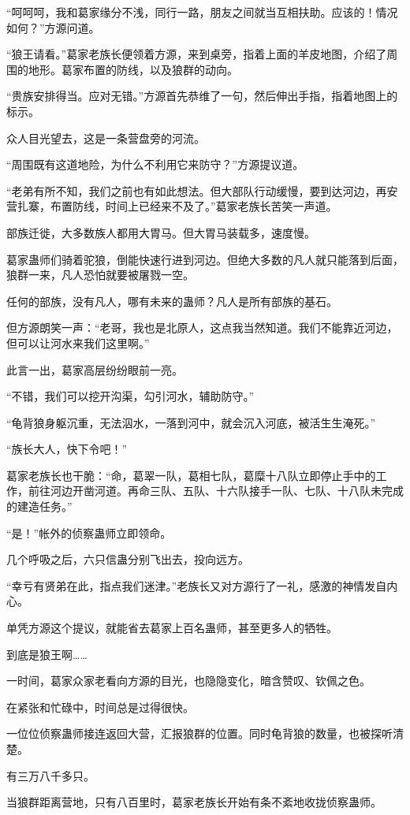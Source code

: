 \begin{this_body}
“呵呵呵，我和葛家缘分不浅，同行一路，朋友之间就当互相扶助。应该的！情况如何？”方源问道。

“狼王请看。”葛家老族长便领着方源，来到桌旁，指着上面的羊皮地图，介绍了周围的地形。葛家布置的防线，以及狼群的动向。

“贵族安排得当。应对无错。”方源首先恭维了一句，然后伸出手指，指着地图上的标示。

众人目光望去，这是一条营盘旁的河流。

“周围既有这道地险，为什么不利用它来防守？”方源提议道。

“老弟有所不知，我们之前也有如此想法。但大部队行动缓慢，要到达河边，再安营扎寨，布置防线，时间上已经来不及了。”葛家老族长苦笑一声道。

部族迁徙，大多数族人都用大胃马。但大胃马装载多，速度慢。

葛家蛊师们骑着驼狼，倒能快速行进到河边。但绝大多数的凡人就只能落到后面，狼群一来，凡人恐怕就要被屠戮一空。

任何的部族，没有凡人，哪有未来的蛊师？凡人是所有部族的基石。

但方源朗笑一声：“老哥，我也是北原人，这点我当然知道。我们不能靠近河边，但可以让河水来我们这里啊。”

此言一出，葛家高层纷纷眼前一亮。

“不错，我们可以挖开沟渠，勾引河水，辅助防守。”

“龟背狼身躯沉重，无法泅水，一落到河中，就会沉入河底，被活生生淹死。”

“族长大人，快下令吧！”

葛家老族长也干脆：“命，葛翠一队，葛相七队，葛糜十八队立即停止手中的工作，前往河边开凿河道。再命三队、五队、十六队接手一队、七队、十八队未完成的建造任务。”

“是！”帐外的侦察蛊师立即领命。

几个呼吸之后，六只信蛊分别飞出去，投向远方。

“幸亏有贤弟在此，指点我们迷津。”老族长又对方源行了一礼，感激的神情发自内心。

单凭方源这个提议，就能省去葛家上百名蛊师，甚至更多人的牺牲。

到底是狼王啊……

一时间，葛家众家老看向方源的目光，也隐隐变化，暗含赞叹、钦佩之色。

在紧张和忙碌中，时间总是过得很快。

一位位侦察蛊师接连返回大营，汇报狼群的位置。同时龟背狼的数量，也被探听清楚。

有三万八千多只。

当狼群距离营地，只有八百里时，葛家老族长开始有条不紊地收拢侦察蛊师。


\end{this_body}
